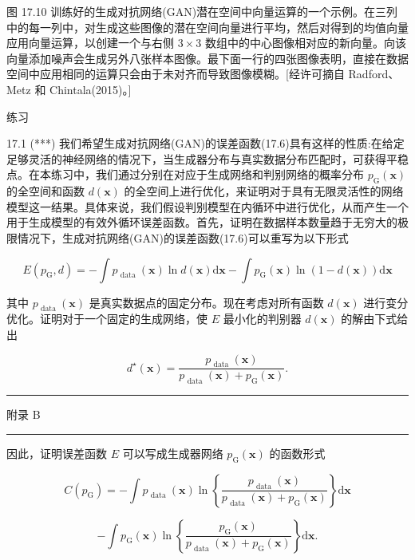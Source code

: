 \documentclass[10pt]{report}
\newcommand{\HRule}{\begin{center}\rule{0.9\linewidth}{0.2mm}\end{center}}
\begin{document}
图 17.10 训练好的生成对抗网络(GAN)潜在空间中向量运算的一个示例。在三列中的每一列中，对生成这些图像的潜在空间向量进行平均，然后对得到的均值向量应用向量运算，以创建一个与右侧 \(3 \times  3\) 数组中的中心图像相对应的新向量。向该向量添加噪声会生成另外八张样本图像。最下面一行的四张图像表明，直接在数据空间中应用相同的运算只会由于未对齐而导致图像模糊。[经许可摘自 Radford、Metz 和 Chintala(2015)。]

练习

17.1 (***) 我们希望生成对抗网络(GAN)的误差函数(17.6)具有这样的性质:在给定足够灵活的神经网络的情况下，当生成器分布与真实数据分布匹配时，可获得平稳点。在本练习中，我们通过分别在对应于生成网络和判别网络的概率分布 \({p}_{\mathrm{G}}\left( \mathbf{x}\right)\) 的全空间和函数 \(d\left( \mathbf{x}\right)\) 的全空间上进行优化，来证明对于具有无限灵活性的网络模型这一结果。具体来说，我们假设判别模型在内循环中进行优化，从而产生一个用于生成模型的有效外循环误差函数。首先，证明在数据样本数量趋于无穷大的极限情况下，生成对抗网络(GAN)的误差函数(17.6)可以重写为以下形式

\[
E\left( {{p}_{\mathrm{G}},d}\right)  =  - \int {p}_{\text{ data }}\left( \mathbf{x}\right) \ln d\left( \mathbf{x}\right) \mathrm{d}\mathbf{x} - \int {p}_{\mathrm{G}}\left( \mathbf{x}\right) \ln \left( {1 - d\left( \mathbf{x}\right) }\right) \mathrm{d}\mathbf{x} \tag{17.14}
\]

其中 \({p}_{\text{ data }}\left( \mathbf{x}\right)\) 是真实数据点的固定分布。现在考虑对所有函数 \(d\left( \mathbf{x}\right)\) 进行变分优化。证明对于一个固定的生成网络，使 \(E\) 最小化的判别器 \(d\left( \mathbf{x}\right)\) 的解由下式给出

\[
{d}^{ \star  }\left( \mathbf{x}\right)  = \frac{{p}_{\text{ data }}\left( \mathbf{x}\right) }{{p}_{\text{ data }}\left( \mathbf{x}\right)  + {p}_{\mathrm{G}}\left( \mathbf{x}\right) }. \tag{17.15}
\]

\HRule

附录 B

\HRule

因此，证明误差函数 \(E\) 可以写成生成器网络 \({p}_{\mathrm{G}}\left( \mathbf{x}\right)\) 的函数形式

\[
C\left( {p}_{\mathrm{G}}\right)  =  - \int {p}_{\text{ data }}\left( \mathbf{x}\right) \ln \left\{  \frac{{p}_{\text{ data }}\left( \mathbf{x}\right) }{{p}_{\text{ data }}\left( \mathbf{x}\right)  + {p}_{\mathrm{G}}\left( \mathbf{x}\right) }\right\}  \mathrm{d}\mathbf{x}
\]

\[
- \int {p}_{\mathrm{G}}\left( \mathbf{x}\right) \ln \left\{  \frac{{p}_{\mathrm{G}}\left( \mathbf{x}\right) }{{p}_{\text{ data }}\left( \mathbf{x}\right)  + {p}_{\mathrm{G}}\left( \mathbf{x}\right) }\right\}  \mathrm{d}\mathbf{x}. \tag{17.16}
\]
\end{document}
